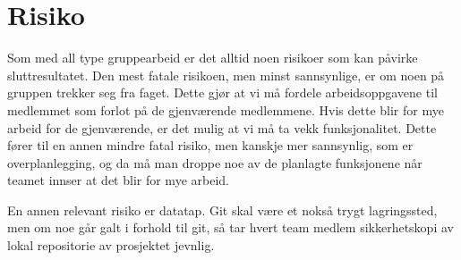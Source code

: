 \documentclass{article}
\begin{document}
\section*{Risiko}
Som med all type gruppearbeid er det alltid noen risikoer som kan påvirke sluttresultatet. Den mest fatale risikoen, men minst sannsynlige, er om noen på gruppen trekker seg fra faget. Dette gjør at vi må fordele arbeidsoppgavene til medlemmet som forlot på de gjenværende medlemmene. Hvis dette blir for mye arbeid for de gjenværende, er det mulig at vi må ta vekk funksjonalitet. Dette fører til en annen mindre fatal risiko, men kanskje mer sannsynlig, som er overplanlegging, og da må man droppe noe av de planlagte funksjonene når teamet innser at det blir for mye arbeid.

En annen relevant risiko er datatap. Git skal være et nokså trygt lagringssted, men om noe går galt i forhold til git, så tar hvert team medlem sikkerhetskopi av lokal repositorie av prosjektet jevnlig.
\end{document}

